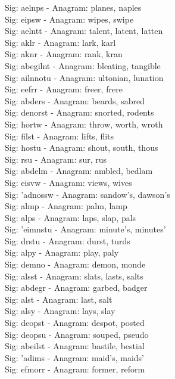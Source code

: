Sig: {aelnps} - Anagram: planes, naples \\
Sig: {eipsw} - Anagram: wipes, swipe \\
Sig: {aelntt} - Anagram: talent, latent, latten \\
Sig: {aklr} - Anagram: lark, karl \\
Sig: {aknr} - Anagram: rank, kran \\
Sig: {abegilnt} - Anagram: bleating, tangible \\
Sig: {ailnnotu} - Anagram: ultonian, lunation \\
Sig: {eefrr} - Anagram: freer, frere \\
Sig: {abders} - Anagram: beards, sabred \\
Sig: {denorst} - Anagram: snorted, rodents \\
Sig: {hortw} - Anagram: throw, worth, wroth \\
Sig: {filst} - Anagram: lifts, flits \\
Sig: {hostu} - Anagram: shout, south, thous \\
Sig: {rsu} - Anagram: sur, rus \\
Sig: {abdelm} - Anagram: ambled, bedlam \\
Sig: {eisvw} - Anagram: views, wives \\
Sig: {'adnossw} - Anagram: sandow's, dawson's \\
Sig: {almp} - Anagram: palm, lamp \\
Sig: {alps} - Anagram: laps, slap, pals \\
Sig: {'eimnstu} - Anagram: minute's, minutes' \\
Sig: {drstu} - Anagram: durst, turds \\
Sig: {alpy} - Anagram: play, paly \\
Sig: {demno} - Anagram: demon, monde \\
Sig: {alsst} - Anagram: slats, lasts, salts \\
Sig: {abdegr} - Anagram: garbed, badger \\
Sig: {alst} - Anagram: last, salt \\
Sig: {alsy} - Anagram: lays, slay \\
Sig: {deopst} - Anagram: despot, posted \\
Sig: {deopsu} - Anagram: souped, pseudo \\
Sig: {abeilst} - Anagram: bastile, bestial \\
Sig: {'adims} - Anagram: maid's, maids' \\
Sig: {efmorr} - Anagram: former, reform \\
